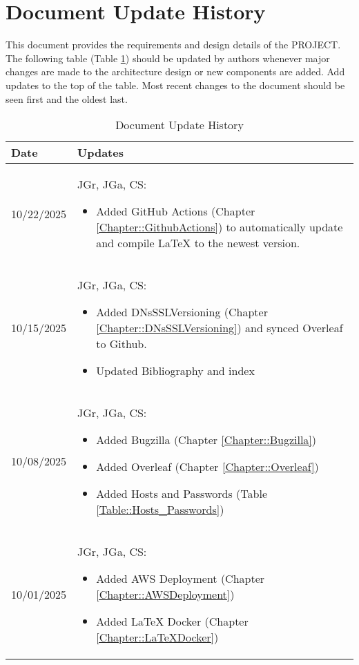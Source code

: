 \section{Document Update History}

This document provides the requirements and design details of the
PROJECT.  The following table (Table \ref{Table::UpdateHistory}) should be
updated by authors whenever major changes are made to the architecture
design or new components are added. Add updates to the top of the table.  
Most recent changes to the document should be seen first and the oldest 
last.

\begin{longtable}{|l||p{12.5cm}|}
\caption{Document Update History \label{Table::UpdateHistory}}\\
\hline
\textbf{Date} & \textbf{Updates} \\
\hline 
\endhead


10/22/2025 & JGr, JGa, CS:
\begin{itemize}[topsep=0pt,itemsep=0pt,parsep=0pt,partopsep=0pt,leftmargin=12pt]
\item Added GitHub Actions (Chapter \ref{Chapter::GithubActions}) to automatically update and compile LaTeX to the newest version.
\end{itemize} 
\\ \hline

10/15/2025 & JGr, JGa, CS:
\begin{itemize}[topsep=0pt,itemsep=0pt,parsep=0pt,partopsep=0pt,leftmargin=12pt]
\item Added DNsSSLVersioning (Chapter \ref{Chapter::DNsSSLVersioning}) and synced Overleaf to Github.
\item Updated Bibliography and index
\end{itemize} 
\\ \hline

10/08/2025 & JGr, JGa, CS:
\begin{itemize}[topsep=0pt,itemsep=0pt,parsep=0pt,partopsep=0pt,leftmargin=12pt]
\item Added Bugzilla (Chapter \ref{Chapter::Bugzilla})
\item Added Overleaf (Chapter \ref{Chapter::Overleaf})
\item Added Hosts and Passwords (Table \ref{Table::Hosts_Passwords})
\end{itemize} 
\\ \hline

10/01/2025 & JGr, JGa, CS:
\begin{itemize}[topsep=0pt,itemsep=0pt,parsep=0pt,partopsep=0pt,leftmargin=12pt]
\item Added AWS Deployment (Chapter \ref{Chapter::AWSDeployment})
\item Added LaTeX Docker (Chapter \ref{Chapter::LaTeXDocker})
\end{itemize} 
\\ \hline


\end{longtable}
